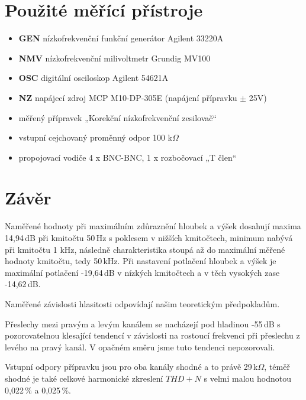 \documentclass[a4paper, czech]{article}
\begin{document}
\section{Použité měřící přístroje}

\begin{itemize}
    \item \textbf{GEN} nízkofrekvenční funkční generátor Agilent 33220A
    \item \textbf{NMV} nízkofrekvenční milivoltmetr Grundig MV100
    \item \textbf{OSC} digitální osciloskop Agilent 54621A
    \item \textbf{NZ} napájecí zdroj MCP M10-DP-305E (napájení přípravku $\pm$ 25V)
    \item měřený přípravek „Korekční nízkofrekvenční zesilovač“
    \item vstupní cejchovaný proměnný odpor 100 k$\Omega$
    \item propojovací vodiče 4 x BNC-BNC, 1 x rozbočovací „T člen“
\end{itemize}

\section{Závěr}

Naměřené hodnoty při maximálním zdůraznění hloubek a výšek dosahují maxima 14,94\,dB při kmitočtu 50\,Hz s poklesem v nižších kmitočtech, minimum nabývá při kmitočtu 1 kHz, následně charakteristika stoupá až do maximální měřené hodnoty kmitočtu, tedy 50\,kHz.
Při nastavení potlačení hloubek a výšek je maximální potlačení -19,64\,dB v nízkých kmitočtech a v těch vysokých zase -14,62\,dB.

Naměřené závislosti hlasitosti odpovídají našim teoretickým předpokladům.

Přeslechy mezi pravým a levým kanálem se nacházejí pod hladinou -55\,dB s pozorovatelnou klesající tendencí v závislosti na rostoucí frekvenci při přeslechu z levého na pravý kanál.
V opačném směru jsme tuto tendenci nepozorovali.

Vstupní odpory přípravku jsou pro oba kanály shodné a to právě 29\,k$\Omega$, téměř shodné je také celkové harmonické zkreslení $THD+N$ s velmi malou hodnotou 0,022\,\% a 0,025\,\%.
\end{document}
